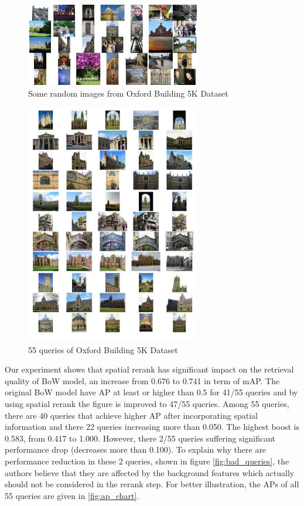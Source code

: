 \begin{figure}
    \centering
    \includegraphics[width=3.0in]{oxbuilding.jpg}
    \caption{Some random images from Oxford Building 5K Dataset}
    \label{fig:oxbuilding}
\end{figure}

\begin{figure}
    \centering
    \includegraphics[width=3.0in]{oxbuilding_query.pdf}
    \caption{55 queries of Oxford Building 5K Dataset}
    \label{fig:oxbuilding_query}
\end{figure}

Our experiment shows that spatial rerank has significant impact on the retrieval quality of BoW model, an increase from 0.676 to 0.741 in term of mAP. The original BoW model have AP at least or higher than 0.5 for 41/55 queries and by using spatial rerank the figure is improved to 47/55 queries. Among 55 queries, there are 40 queries that achieve higher AP after incorporating spatial information and there 22 queries increasing more than 0.050. The highest boost is 0.583, from 0.417 to 1.000. However, there 2/55 queries suffering significant performance drop (decreases more than 0.100). To explain why there are performance reduction in these 2 queries, shown in figure \ref{fig:bad_queries}, the authors believe that they are affected by the background features which actually should not be considered in the rerank step. For better illustration, the APs of all 55 queries are given in \ref{fig:ap_chart}.

